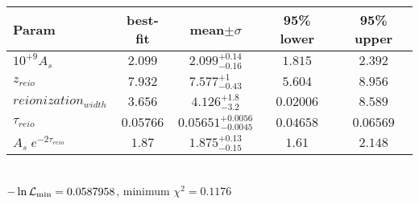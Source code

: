 \begin{tabular}{|l|c|c|c|c|} 
 \hline 
Param & best-fit & mean$\pm\sigma$ & 95\% lower & 95\% upper \\ \hline 
$10^{+9}A_{s }$ &$2.099$ & $2.099_{-0.16}^{+0.14}$ & $1.815$ & $2.392$ \\ 
$z_{reio }$ &$7.932$ & $7.577_{-0.43}^{+1}$ & $5.604$ & $8.956$ \\ 
$reionization_{width }$ &$3.656$ & $4.126_{-3.2}^{+1.8}$ & $0.02006$ & $8.589$ \\ 
$\tau{}_{reio }$ &$0.05766$ & $0.05651_{-0.0045}^{+0.0056}$ & $0.04658$ & $0.06569$ \\ 
$A_s \; e^{-2 \tau_{reio}}$ &$1.87$ & $1.875_{-0.15}^{+0.13}$ & $1.61$ & $2.148$ \\ 
\hline 
 \end{tabular} \\ 
$-\ln{\cal L}_\mathrm{min} =0.0587958$, minimum $\chi^2=0.1176$ \\ 
